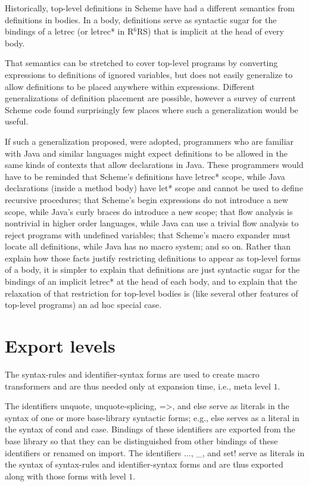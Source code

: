 \documentclass[twoside,twocolumn]{algol60}
\newcommand{\rn}[1]{R$^{#1}$RS}
\begin{document}
Historically, top-level definitions in Scheme have had a different
semantics from definitions in bodies.  In a body, definitions serve as
syntactic sugar for the bindings of a {\cf letrec} (or {\cf letrec*}
in \rn{6}) that is implicit at the head of every body.

That semantics can be stretched to cover top-level programs by
converting expressions to definitions of ignored variables, but does
not easily generalize to allow definitions to be placed anywhere
within expressions.  Different generalizations of definition placement
are possible, however a survey of current Scheme code found
surprisingly few places where such a generalization would be useful.

If such a generalization proposed, were adopted, programmers who are
familiar with Java and similar languages might expect definitions to
be allowed in the same kinds of contexts that allow declarations in
Java.  These programmers would have to be reminded that Scheme's
definitions have {\cf letrec*} scope, while Java declarations (inside
a method body) have {\cf let*} scope and cannot be used to define
recursive procedures; that Scheme's begin expressions do not introduce
a new scope, while Java's curly braces do introduce a new scope; that
flow analysis is nontrivial in higher order languages, while Java can
use a trivial flow analysis to reject programs with undefined
variables; that Scheme's macro expander must locate all definitions,
while Java has no macro system; and so on.  Rather than explain how
those facts justify restricting definitions to appear as top-level
forms of a body, it is simpler to explain that definitions are just
syntactic sugar for the bindings of an implicit {\cf letrec*} at the
head of each body, and to explain that the relaxation of that
restriction for top-level bodies is (like several other features of
top-level programs) an ad hoc special case.

\section{Export levels}

The {\cf syntax-rules} and {\cf identifier-syntax} forms are
used to create macro transformers and are thus needed only at
expansion time, i.e., meta level $1$.  

The identifiers {\cf unquote}, {\cf unquote-splicing}, {\cf =>}, and
{\cf else} serve as literals in the syntax of one or more
base-library syntactic forms; e.g., {\cf else} serves as a
literal in the syntax of {\cf cond} and {\cf case}.
Bindings of these identifiers are exported from the base library so
that they can be distinguished from other bindings of these identifiers
or renamed on import.
The identifiers {\cf ...}, {\cf \_}, and {\cf set!} serve as
literals in the syntax of {\cf syntax-rules} and
{\cf identifier-syntax} forms and are thus exported along with those
forms with level $1$.
\end{document}
